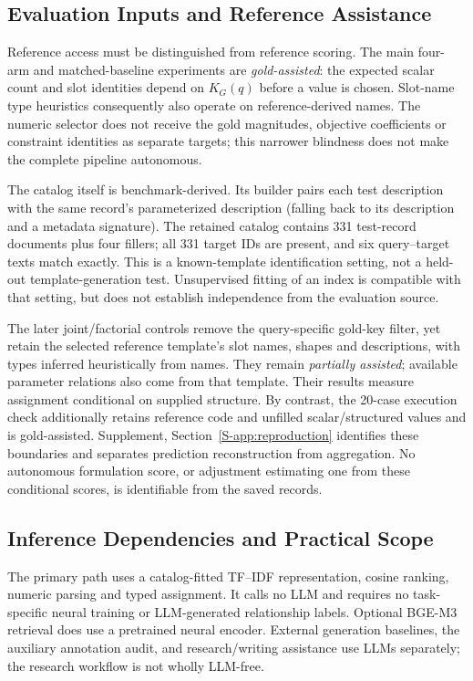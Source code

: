 \documentclass[pdflatex,sn-basic,Numbered]{sn-jnl}
\begin{document}
\subsection{Evaluation Inputs and Reference Assistance}
\label{subsec:assistance-setting}

Reference access must be distinguished from reference scoring. The main four-arm and matched-baseline experiments are \emph{gold-assisted}: the expected scalar count and slot identities depend on $K_G(q)$ before a value is chosen. Slot-name type heuristics consequently also operate on reference-derived names. The numeric selector does not receive the gold magnitudes, objective coefficients or constraint identities as separate targets; this narrower blindness does not make the complete pipeline autonomous.

The catalog itself is benchmark-derived. Its builder pairs each test description with the same record's parameterized description (falling back to its description and a metadata signature). The retained catalog contains 331 test-record documents plus four fillers; all 331 target IDs are present, and six query--target texts match exactly. This is a known-template identification setting, not a held-out template-generation test. Unsupervised fitting of an index is compatible with that setting, but does not establish independence from the evaluation source.

The later joint/factorial controls remove the query-specific gold-key filter, yet retain the selected reference template's slot names, shapes and descriptions, with types inferred heuristically from names. They remain \emph{partially assisted}; available parameter relations also come from that template. Their results measure assignment conditional on supplied structure. By contrast, the 20-case execution check additionally retains reference code and unfilled scalar/structured values and is gold-assisted. Supplement, Section~\ref{S-app:reproduction} identifies these boundaries and separates prediction reconstruction from aggregation. No autonomous formulation score, or adjustment estimating one from these conditional scores, is identifiable from the saved records.

\subsection{Inference Dependencies and Practical Scope}
\label{subsec:inference-dependencies}

The primary path uses a catalog-fitted TF--IDF representation, cosine ranking, numeric parsing and typed assignment. It calls no LLM and requires no task-specific neural training or LLM-generated relationship labels. Optional BGE-M3 retrieval does use a pretrained neural encoder. External generation baselines, the auxiliary annotation audit, and research/writing assistance use LLMs separately; the research workflow is not wholly LLM-free.
\end{document}
